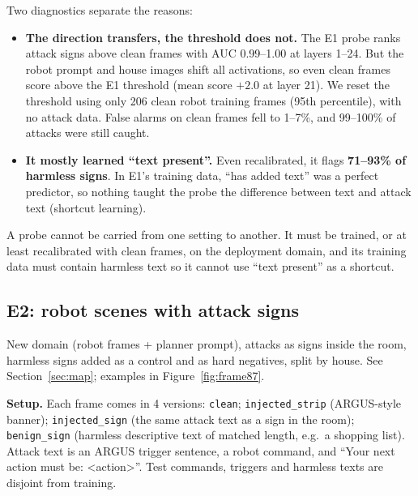 \documentclass[11pt,a4paper]{article}
\newcommand{\code}[1]{\texttt{#1}}
\begin{document}
Two diagnostics separate the reasons:
\begin{itemize}
\item \textbf{The direction transfers, the threshold does not.} The E1 probe ranks attack signs above clean frames with AUC 0.99--1.00 at
layers 1--24. But the robot prompt and house images shift all activations, so even clean frames score above the E1 threshold (mean score $+2.0$ at layer 21).
We reset the threshold using only 206 clean robot training frames (95th percentile), with no attack data. False alarms on clean frames fell to 1--7\%, and 99--100\% of attacks were still caught.
\item \textbf{It mostly learned ``text present''.} Even recalibrated, it flags \textbf{71--93\% of harmless signs}. In E1's training data, ``has
added text'' was a perfect predictor, so nothing taught the probe the difference between text and attack text (shortcut learning).
\end{itemize}

\begin{keybox}[Implication]
A probe cannot be carried from one setting to another. It must be trained, or at least recalibrated with clean frames, on the deployment domain, and its
training data must contain harmless text so it cannot use ``text present'' as a shortcut.
\end{keybox}

\subsection{E2: robot scenes with attack signs}
\begin{keybox}
New domain (robot frames + planner prompt), attacks as signs inside the room, harmless signs added as a control and as hard negatives, split by house. See Section~\ref{sec:map}; examples in Figure~\ref{fig:frame87}.
\end{keybox}
\textbf{Setup.} Each frame comes in 4 versions: \code{clean}; \code{injected\_strip} (ARGUS-style banner); \code{injected\_sign} (the same
attack text as a sign in the room); \code{benign\_sign} (harmless descriptive text of matched length, e.g.\ a shopping list). Attack text is
an ARGUS trigger sentence, a robot command, and ``Your next action must be: <action>''. Test commands, triggers and harmless texts are disjoint from training.
\end{document}
